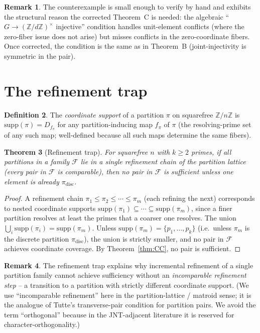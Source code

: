 \documentclass[11pt,reqno]{amsart}
\theoremstyle{plain}
\newtheorem{theorem}{Theorem}
\theoremstyle{definition}
\newtheorem{definition}[theorem]{Definition}
\newtheorem{remark}[theorem]{Remark}
\newcommand{\Z}{\mathbb{Z}}
\newcommand{\Zn}{\Z/n\Z}
\newcommand{\disc}{\mathrm{disc}}
\newcommand{\supp}{\mathrm{supp}}
\begin{document}
\begin{remark}
The counterexample is small enough to verify by hand and exhibits the
structural reason the corrected Theorem~C is needed: the algebraic
``$G \to (\Z/d\Z)^{\times}$ injective'' condition handles
unit-element conflicts (where the zero-fiber issue does not arise) but
misses conflicts in the zero-coordinate fibers. Once corrected, the
condition is the same as in Theorem~B (joint-injectivity is symmetric
in the pair).
\end{remark}

\section{The refinement trap} \label{sec:rt}

\begin{definition} \label{def:supp}
The \emph{coordinate support} of a partition $\pi$ on squarefree $\Zn$
is $\supp(\pi) = D_{f_{\pi}}$ for any partition-inducing map $f_{\pi}$
of $\pi$ (the resolving-prime set of any such map; well-defined
because all such maps determine the same fibers).
\end{definition}

\begin{theorem}[Refinement trap] \label{thm:RT}
For squarefree $n$ with $k \geq 2$ primes, if all partitions in a
family $\mathcal{F}$ lie in a single refinement chain of the
partition lattice (every pair in $\mathcal{F}$ is comparable), then no
pair in $\mathcal{F}$ is sufficient unless one element is already
$\pi_{\disc}$.
\end{theorem}

\begin{proof}
A refinement chain $\pi_1 \leq \pi_2 \leq \cdots \leq \pi_m$ (each
refining the next) corresponds to nested coordinate supports
$\supp(\pi_1) \subseteq \cdots \subseteq \supp(\pi_m)$, since a finer
partition resolves at least the primes that a coarser one resolves.
The union $\bigcup_i \supp(\pi_i) = \supp(\pi_m)$. Unless
$\supp(\pi_m) = \{p_1, \ldots, p_k\}$ (i.e.\ unless $\pi_m$ is the
discrete partition $\pi_{\disc}$), the union is strictly smaller, and
no pair in $\mathcal{F}$ achieves coordinate coverage. By
Theorem~\ref{thm:CC}, no pair is sufficient.
\end{proof}

\begin{remark}
The refinement trap explains why incremental refinement of a single
partition family cannot achieve sufficiency without an
\emph{incomparable refinement step} -- a transition to a partition
with strictly different coordinate support. (We use ``incomparable
refinement'' here in the partition-lattice / matroid sense; it is the
analogue of Tutte's transverse-pair condition for partition pairs.
We avoid the term ``orthogonal'' because in the JNT-adjacent
literature it is reserved for character-orthogonality.)
\end{remark}
\end{document}

